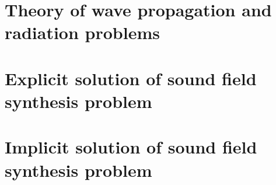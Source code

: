 \section{Theory of wave propagation and radiation problems}

\section{Explicit solution of sound field synthesis problem}

\section{Implicit solution of sound field synthesis problem}